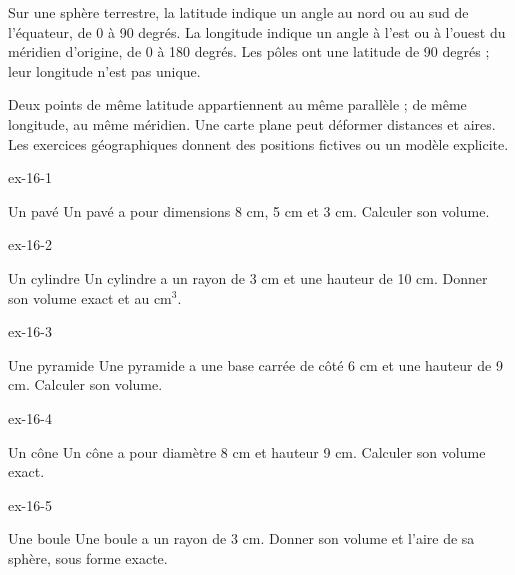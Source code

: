 \begin{definition}Sur une sphère terrestre, la latitude indique un angle au nord ou au sud de l’équateur, de 0 à 90 degrés. La longitude indique un angle à l’est ou à l’ouest du méridien d’origine, de 0 à 180 degrés. Les pôles ont une latitude de 90 degrés ; leur longitude n’est pas unique.\end{definition}
\begin{attention}Deux points de même latitude appartiennent au même parallèle ; de même longitude, au même méridien. Une carte plane peut déformer distances et aires. Les exercices géographiques donnent des positions fictives ou un modèle explicite.\end{attention}
\clearpage{}
\begin{blocLivre}{ex-16-1}\begin{exercice}[1]{Un pavé}
Un pavé a pour dimensions 8 cm, 5 cm et 3 cm. Calculer son volume.
\label{fig-ex-16-1}
\end{exercice}\end{blocLivre}
\begin{blocLivre}{ex-16-2}\begin{exercice}[1]{Un cylindre}
Un cylindre a un rayon de 3 cm et une hauteur de 10 cm. Donner son volume exact et au cm$^3$.
\label{fig-ex-16-2}
\end{exercice}\end{blocLivre}
\begin{blocLivre}{ex-16-3}\begin{exercice}[1]{Une pyramide}
Une pyramide a une base carrée de côté 6 cm et une hauteur de 9 cm. Calculer son volume.
\label{fig-ex-16-3}
\end{exercice}\end{blocLivre}
\begin{blocLivre}{ex-16-4}\begin{exercice}[1]{Un cône}
Un cône a pour diamètre 8 cm et hauteur 9 cm. Calculer son volume exact.
\label{fig-ex-16-4}
\end{exercice}\end{blocLivre}
\begin{blocLivre}{ex-16-5}\begin{exercice}[1]{Une boule}
Une boule a un rayon de 3 cm. Donner son volume et l’aire de sa sphère, sous forme exacte.
\label{fig-ex-16-5}
\end{exercice}\end{blocLivre}

